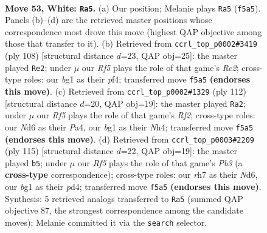 \documentclass[11pt]{article}
\begin{document}
\clearpage

\begin{figure}[p]\centering
\begin{subfigure}{0.46\textwidth}\centering
\resizebox{\linewidth}{!}{%
\newchessgame
\chessboard[
  setfen={3k4/7r/3Nn3/5RP1/P6p/8/6P1/4K1b1 w - - 0 53},
  showmover=false,
  pgfstyle=straightmove, color=movearrow, markmove={f5-a5}
]}
\caption{}
\end{subfigure}\hfill
\begin{subfigure}{0.46\textwidth}\centering
\resizebox{\linewidth}{!}{%
\newchessgame
\chessboard[
  setfen={8/6rp/8/7P/1k3p2/3n1N2/2R2P1K/8 w - - 1 55},
  showmover=false,
  pgfstyle=straightmove, color=movearrow, markmove={c2-e2}
]}
\caption{}
\end{subfigure}
\\[4pt]
\begin{subfigure}{0.46\textwidth}\centering
\resizebox{\linewidth}{!}{%
\newchessgame
\chessboard[
  setfen={6k1/8/8/7n/P2p1P1N/1r6/5R2/6K1 w - - 0 57},
  showmover=false,
  pgfstyle=straightmove, color=movearrow, markmove={f2-a2}
]}
\caption{}
\end{subfigure}\hfill
\begin{subfigure}{0.46\textwidth}\centering
\resizebox{\linewidth}{!}{%
\newchessgame
\chessboard[
  setfen={6k1/6p1/1p1nN3/8/3Pp3/p6P/8/B6K b - - 3 58},
  showmover=false,
  pgfstyle=straightmove, color=movearrow, markmove={b6-b5}
]}
\caption{}
\end{subfigure}
\caption{\textbf{Move 53, White: \texttt{Ra5}.} (a) Our position; Melanie plays \texttt{Ra5} (\texttt{f5a5}). Panels (b)--(d) are the retrieved master positions whose correspondence most drove this move (highest QAP objective among those that transfer to it). (b) Retrieved from \texttt{ccrl\_top\_p0002\#3419} (ply 108) [structural distance $d$=23, QAP obj=25]: the master played \texttt{Re2}; under $\mu$ our \emph{Rf5} plays the role of that game's \emph{Rc2}; cross-type roles: our \emph{b}g1 as their \emph{p}f4; transferred move \texttt{f5a5} \textbf{(endorses this move)}. (c) Retrieved from \texttt{ccrl\_top\_p0002\#1329} (ply 112) [structural distance $d$=20, QAP obj=19]: the master played \texttt{Ra2}; under $\mu$ our \emph{Rf5} plays the role of that game's \emph{Rf2}; cross-type roles: our \emph{N}d6 as their \emph{P}a4, our \emph{b}g1 as their \emph{N}h4; transferred move \texttt{f5a5} \textbf{(endorses this move)}. (d) Retrieved from \texttt{ccrl\_top\_p0003\#2209} (ply 115) [structural distance $d$=22, QAP obj=19]: the master played \texttt{b5}; under $\mu$ our \emph{Rf5} plays the role of that game's \emph{Pb3} (a \textbf{cross-type} correspondence); cross-type roles: our \emph{r}h7 as their \emph{N}d6, our \emph{b}g1 as their \emph{p}d4; transferred move \texttt{f5a5} \textbf{(endorses this move)}. Synthesis: 5 retrieved analogs transferred to \texttt{Ra5} (summed QAP objective 87, the strongest correspondence among the candidate moves); Melanie committed it via the \texttt{search} selector.}
\label{fig:thought-m104}
\end{figure}
\end{document}
